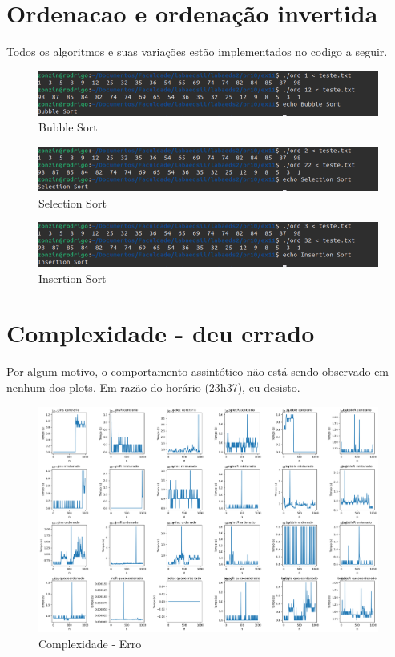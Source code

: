 \section{Ordenacao e ordenação invertida}
Todos os algoritmos e suas variações estão implementados no codigo a seguir. 

\begin{figure}[h!]
	\centering
	\includegraphics[width=0.7\linewidth]{imgs/bubble}
	\caption{Bubble Sort}
	\label{fig:bubble}
\end{figure}

\begin{figure}[h!]
	\centering
	\includegraphics[width=0.7\linewidth]{imgs/selec}
	\caption{Selection Sort}
	\label{fig:selec}
\end{figure}

\begin{figure}[h!]
	\centering
	\includegraphics[width=0.7\linewidth]{imgs/insertion}
	\caption{Insertion Sort}
	\label{fig:insertion}
\end{figure}


\section{Complexidade - deu errado}
Por algum motivo, o comportamento assintótico não está sendo observado em nenhum dos plots. Em razão do horário (23h37), eu desisto. 

\begin{figure}[h!]
	\centering
	\includegraphics[width=0.8\linewidth]{imgs/deuerrado}
	\caption{Complexidade - Erro}
	\label{fig:deuerrado}
\end{figure}

